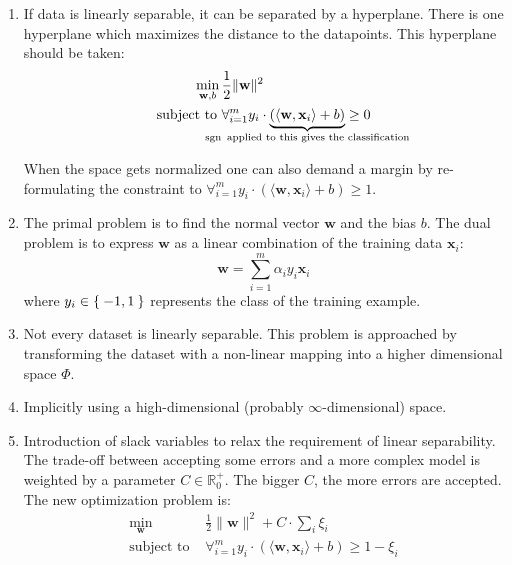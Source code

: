 \begin{enumerate}
    \item If data is linearly separable, it can be separated by a hyperplane.
          There is one hyperplane which maximizes the distance to the
          datapoints. This hyperplane should be taken:\\
          \begin{equation*}
          \begin{aligned}
              \min_{\textbf{w}, b}\,&\frac{1}{2} \|\textbf{w}\|^2\\
              \text{subject to }& \forall_{i=1}^m y_i \cdot \underbrace{(\langle \textbf{w}, \textbf{x}_i\rangle + b)}_{\mathclap{\sgn \text{ applied to this gives the classification}}} \geq 0
          \end{aligned}
          \end{equation*}

          When the space gets normalized one can also demand a margin by re-formulating
          the constraint to
          $\forall_{i=1}^m y_i \cdot (\langle \textbf{w}, \textbf{x}_i\rangle + b) \geq 1$.
    \item The primal problem is to find the normal vector $\textbf{w}$ and the
          bias $b$. The dual problem is to express $\textbf{w}$ as a linear
          combination of the training data $\textbf{x}_i$:
          \[\textbf{w} = \sum_{i=1}^m \alpha_i y_i \textbf{x}_i\]
          where $y_i \in \Set{-1, 1}$ represents the class of the training
          example.
    \item Not every dataset is linearly separable. This problem is approached
          by transforming the dataset with a non-linear mapping into a higher
          dimensional space $\Phi$.
    \item Implicitly using a high-dimensional (probably $\infty$-dimensional)
          space. %
    \item Introduction of slack variables to relax the requirement of linear
          separability. The trade-off between accepting some errors and a more
          complex model is weighted by a parameter $C \in \mathbb{R}_0^+$. The
          bigger $C$, the more errors are accepted. The new optimization
          problem is:
          \begin{equation*}
          \begin{aligned}
              \min_{\textbf{w}}\,&\frac{1}{2} \|\textbf{w}\|^2 + C \cdot \sum_{i} \xi_i\\
              \text{subject to }& \forall_{i=1}^m y_i \cdot (\langle \textbf{w}, \textbf{x}_i\rangle + b) \geq 1 - \xi_i
          \end{aligned}
          \end{equation*}
\end{enumerate}

